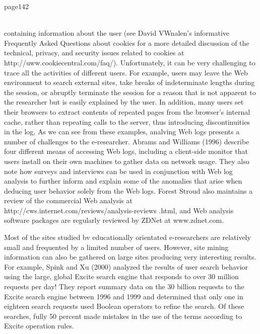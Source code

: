 \documentclass{book}
\begin{document}
page$142$\\\\\par
containing information about the user (see David VWnalen's informative Frequently Asked Questions about cookies for a more detailed discussion of the technical, privacy, and security issues related to cookies at http://uww.cookiecentral.com/faq/). Unfortunately, it can be very challenging to trace all the activities of different users. For example, users may leave the Web environment to search external sites, take breaks of indeterminate lengths during the session, or abruptly terminate the session for a reason that is not apparent to the researcher but is easily explained by the user. In addition, many users set their browsers to extract contents of repeated pages from the browser's internal cache, rather than repeating calls to the server, thus introducing discontinuities in the log, As we can see from these examples, analving Web logs presents a number of challenges to the e-researcher. Abrams and Williams (1996) describe four different means of accessing Web logs, including a client-side monitor that users install on their own machines to gather data on network usage. They also note how surveys and interviews can be used in conjunction with Web log analysis to further inform and explain some of the anomalies that arise when deducing user behavior solely from the Web logs. Forest Stroud also maintains a review of the commercial Web analysis at http://cws.internet.com/reviews/analysis-reviews .html, and Web analysis software packages are regularly reviewed by ZDNet at www.zdnet.com.\par Most of the sites studied bv educationally orientated e-researchers are relatively small and frequented by a limited number of users. However, site mining information can also be gathered on large sites producing very interesting results. For example, Spink and Xu (2000) analyzed the results of user search behavior using the large, global Excite search engine that responds to over 30 million requests per day! They report summary data on the 30 billion requests to the Excite search engine between 1996 and 1999 and determined that only one in eighteen search requests used Boolean operators to refine the search. Of these searches, fully 50 percent made mistakes in the use of the terms according to Excite operation rules.\\
\end{document}
